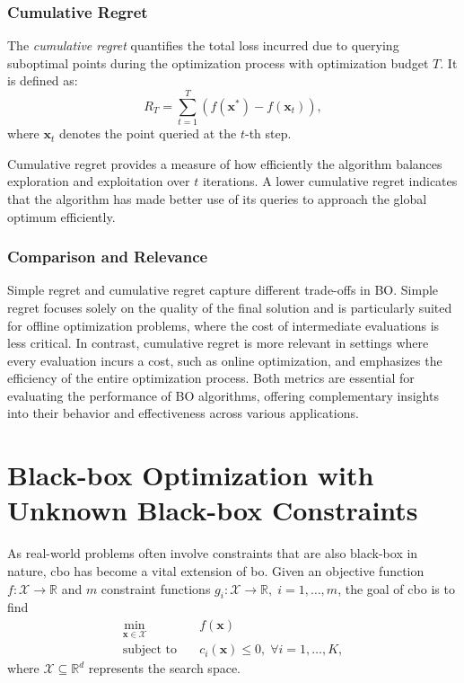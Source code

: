 \subsubsection{Cumulative Regret}

The \emph{cumulative regret} quantifies the total loss incurred due to querying suboptimal points during the optimization process with optimization budget $T$. It is defined as:
\[
R_T = \sum_{t=1}^T \left( f(\mathbf{x}^*) - f(\mathbf{x}_t) \right),
\]
where \( \mathbf{x}_t \) denotes the point queried at the \( t \)-th step. 

Cumulative regret provides a measure of how efficiently the algorithm balances exploration and exploitation over \( t \) iterations. A lower cumulative regret indicates that the algorithm has made better use of its queries to approach the global optimum efficiently.

\subsubsection{Comparison and Relevance}

Simple regret and cumulative regret capture different trade-offs in BO. Simple regret focuses solely on the quality of the final solution and is particularly suited for offline optimization problems, where the cost of intermediate evaluations is less critical. In contrast, cumulative regret is more relevant in settings where every evaluation incurs a cost, such as online optimization, and emphasizes the efficiency of the entire optimization process. Both metrics are essential for evaluating the performance of BO algorithms, offering complementary insights into their behavior and effectiveness across various applications.

\section{Black-box Optimization with Unknown Black-box Constraints}
\label{section:bo_unknown_constraints}
As real-world problems often involve constraints that are also black-box in nature, \ac{cbo} has become a vital extension of \acl{bo}. Given an objective function $f: \mathcal{X} \to \mathbb{R}$ and $m$ constraint functions $g_i: \mathcal{X} \to \mathbb{R}, \; i = 1, \dots, m$, the goal of \ac{cbo} is to find
\begin{equation}
\label{eq:cbo_problem}
\begin{aligned}
    \min_{\mathbf{x} \in \mathcal{X}} \quad & f(\mathbf{x}) \\
    \text{subject to} \quad & c_i(\mathbf{x}) \leq 0, \; \forall i = 1, \dots, K,
\end{aligned}
\end{equation}
where $\mathcal{X} \subseteq \mathbb{R}^d$ represents the search space.

